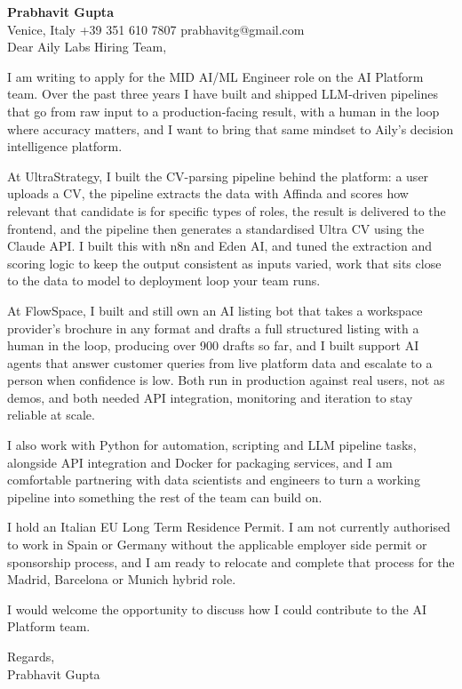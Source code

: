 \documentclass[a4paper,10.5pt]{article}
\begin{document}
\textbf{Prabhavit Gupta}\\
Venice, Italy \textbar{} +39 351 610 7807 \textbar{} prabhavitg@gmail.com\\[10pt]
Dear Aily Labs Hiring Team,

I am writing to apply for the MID AI/ML Engineer role on the AI Platform team. Over the past three years I have built and shipped LLM-driven pipelines that go from raw input to a production-facing result, with a human in the loop where accuracy matters, and I want to bring that same mindset to Aily's decision intelligence platform.

At UltraStrategy, I built the CV-parsing pipeline behind the platform: a user uploads a CV, the pipeline extracts the data with Affinda and scores how relevant that candidate is for specific types of roles, the result is delivered to the frontend, and the pipeline then generates a standardised Ultra CV using the Claude API. I built this with n8n and Eden AI, and tuned the extraction and scoring logic to keep the output consistent as inputs varied, work that sits close to the data to model to deployment loop your team runs.

At FlowSpace, I built and still own an AI listing bot that takes a workspace provider's brochure in any format and drafts a full structured listing with a human in the loop, producing over 900 drafts so far, and I built support AI agents that answer customer queries from live platform data and escalate to a person when confidence is low. Both run in production against real users, not as demos, and both needed API integration, monitoring and iteration to stay reliable at scale.

I also work with Python for automation, scripting and LLM pipeline tasks, alongside API integration and Docker for packaging services, and I am comfortable partnering with data scientists and engineers to turn a working pipeline into something the rest of the team can build on.

I hold an Italian EU Long Term Residence Permit. I am not currently authorised to work in Spain or Germany without the applicable employer side permit or sponsorship process, and I am ready to relocate and complete that process for the Madrid, Barcelona or Munich hybrid role.

I would welcome the opportunity to discuss how I could contribute to the AI Platform team.

Regards,\\
Prabhavit Gupta
\end{document}
